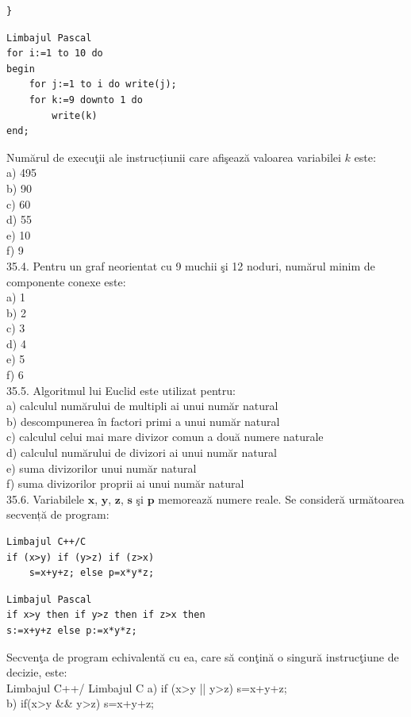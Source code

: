 \begin{itemize}
\begin{enumerate}
\begin{verbatim}
}
\end{verbatim}
\begin{verbatim}
Limbajul Pascal
for i:=1 to 10 do
begin
    for j:=1 to i do write(j);
    for k:=9 downto 1 do
        write(k)
end;
\end{verbatim}
Numărul de execuţii ale instrucțiunii care afişează valoarea variabilei $k$ este:
\\
a) 495
\\
b) 90
\\
c) 60
\\
d) 55
\\
e) 10
\\
f) 9
\\
35.4. Pentru un graf neorientat cu 9 muchii şi 12 noduri, numărul minim de componente conexe este:
\\
a) 1
\\
b) 2
\\
c) 3
\\
d) 4
\\
e) 5
\\
f) 6
\\
35.5. Algoritmul lui Euclid este utilizat pentru:
\\
a) calculul numărului de multipli ai unui număr natural
\\
b) descompunerea în factori primi a unui număr natural
\\
c) calculul celui mai mare divizor comun a două numere naturale
\\
d) calculul numărului de divizori ai unui număr natural
\\
e) suma divizorilor unui număr natural
\\
f) suma divizorilor proprii ai unui număr natural
\\
35.6. Variabilele $\mathbf{x}$, $\mathbf{y}$, $\mathbf{z}$, $\mathbf{s}$ şi $\mathbf{p}$ memorează numere reale. Se consideră următoarea secvență de program:
\begin{verbatim}
Limbajul C++/C
if (x>y) if (y>z) if (z>x)
    s=x+y+z; else p=x*y*z;
\end{verbatim}
\begin{verbatim}
Limbajul Pascal
if x>y then if y>z then if z>x then
s:=x+y+z else p:=x*y*z;
\end{verbatim}
Secvenţa de program echivalentă cu ea, care să conţină o singură instrucţiune de decizie, este:
\\
Limbajul C++/ Limbajul C
a) if (x>y || y>z) s=x+y+z;
\\
b) if(x>y \&\& y>z) s=x+y+z;
\\

\end{enumerate}
\end{itemize}
